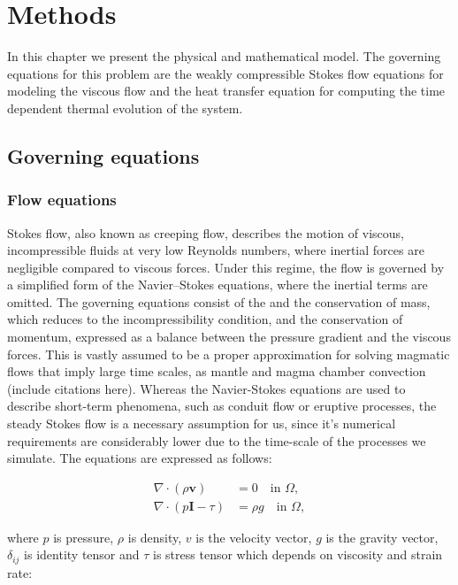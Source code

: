 \chapter{Methods}
In this chapter we present the physical and mathematical model. The governing equations for this problem are the weakly compressible Stokes flow equations for modeling the viscous flow and the heat transfer equation for computing the time dependent thermal evolution of the system.%


\section{Governing equations}
\subsection{Flow equations}
Stokes flow, also known as creeping flow, describes the motion of viscous, incompressible fluids at very low Reynolds numbers, where inertial forces are negligible compared to viscous forces. Under this regime, the flow is governed by a simplified form of the Navier–Stokes equations, where the inertial terms are omitted. The governing equations consist of the and the conservation of mass, which reduces to the incompressibility condition, and the conservation of momentum, expressed as a balance between the pressure gradient and the viscous forces.
This is vastly assumed to be a proper approximation for solving magmatic flows that imply large time scales, as mantle and magma chamber convection (include citations here). Whereas the Navier-Stokes equations are used to describe short-term phenomena, such as conduit flow or eruptive processes, the steady Stokes flow is a necessary assumption for us, since it's numerical requirements are considerably lower due to the time-scale of the processes we simulate. The equations are expressed as follows:

\begin{align}
	\nabla \cdot (\rho \mathbf{v}) &= 0 \quad \text{in } \Omega, \\
	\nabla \cdot (p\boldsymbol{I} - \tau) &= \rho g\quad \text{in } \Omega,
\end{align}

where $p$ is pressure, $\rho$ is density, $v$ is the velocity vector, $g$ is the gravity vector, $\delta_{ij}$  is identity tensor and $\tau$ is stress tensor which depends on viscosity and strain rate:

